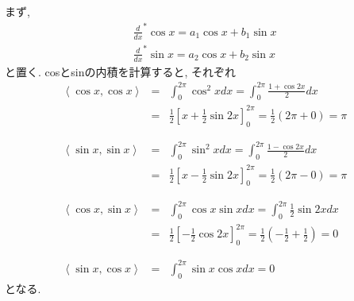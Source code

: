 \documentclass[a4paper,11pt]{jsarticle}
\begin{document}
\section{}
まず, 
\begin{eqnarray*}
  \frac{d}{dx}^*\cos{x} = a_1\cos{x} + b_1\sin{x} \\
  \frac{d}{dx}^*\sin{x} = a_2\cos{x} + b_2\sin{x}
\end{eqnarray*}
と置く. cosとsinの内積を計算すると, それぞれ
\begin{eqnarray*}
  \left<\cos{x}, \cos{x}\right> &=& \int_0^{2\pi}\cos^2{x}dx = \int_0^{2\pi}\frac{1+\cos{2x}}{2}dx \\
  &=& \frac{1}{2}\left[x + \frac{1}{2}\sin{2x}\right]_0^{2\pi}
  = \frac{1}{2}\left(2\pi + 0\right) = \pi \\
  \\\\
  \left<\sin{x}, \sin{x}\right> &=& \int_0^{2\pi}\sin^2{x}dx = \int_0^{2\pi}\frac{1-\cos{2x}}{2}dx \\
  &=& \frac{1}{2}\left[x - \frac{1}{2}\sin{2x}\right]_0^{2\pi}
  = \frac{1}{2}\left(2\pi - 0\right) = \pi \\
  \\\\
  \left<\cos{x}, \sin{x}\right> &=& \int_0^{2\pi}\cos{x}\sin{x}dx
    = \int_0^{2\pi}\frac{1}{2}\sin{2x}dx \\
  &=& \frac{1}{2}\left[-\frac{1}{2}\cos{2x}\right]_0^{2\pi}
  = \frac{1}{2}\left(-\frac{1}{2} + \frac{1}{2}\right) = 0 \\
  \\\\
  \left<\sin{x}, \cos{x}\right> &=& \int_0^{2\pi}\sin{x}\cos{x}dx = 0
\end{eqnarray*}
となる. 
\end{document}
